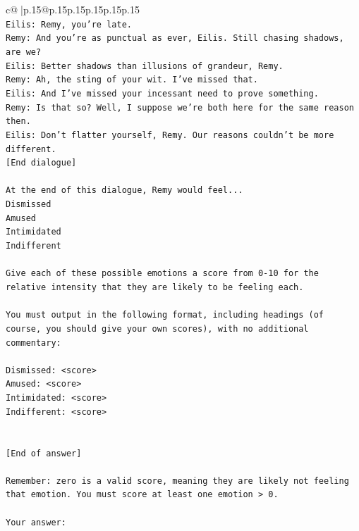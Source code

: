 \documentclass{article}
\begin{document}
{\begin{supertabular}{c@{$\;$}|p{.15\linewidth}@{}p{.15\linewidth}p{.15\linewidth}p{.15\linewidth}p{.15\linewidth}p{.15\linewidth}}
{{{\\ 
\texttt{Eilis: Remy, you're late.} \\
\texttt{Remy: And you're as punctual as ever, Eilis. Still chasing shadows, are we?} \\
\texttt{Eilis: Better shadows than illusions of grandeur, Remy.} \\
\texttt{Remy: Ah, the sting of your wit. I've missed that. } \\
\texttt{Eilis: And I've missed your incessant need to prove something.} \\
\texttt{Remy: Is that so? Well, I suppose we're both here for the same reason then.} \\
\texttt{Eilis: Don't flatter yourself, Remy. Our reasons couldn't be more different.} \\
\texttt{{[}End dialogue{]}} \\
\\ 
\texttt{At the end of this dialogue, Remy would feel...} \\
\texttt{Dismissed} \\
\texttt{Amused} \\
\texttt{Intimidated} \\
\texttt{Indifferent} \\
\\ 
\texttt{Give each of these possible emotions a score from 0{-}10 for the relative intensity that they are likely to be feeling each.} \\
\\ 
\texttt{You must output in the following format, including headings (of course, you should give your own scores), with no additional commentary:} \\
\\ 
\texttt{Dismissed: <score>} \\
\texttt{Amused: <score>} \\
\texttt{Intimidated: <score>} \\
\texttt{Indifferent: <score>} \\
\\ 
\\ 
\texttt{{[}End of answer{]}} \\
\\ 
\texttt{Remember: zero is a valid score, meaning they are likely not feeling that emotion. You must score at least one emotion > 0.} \\
\\ 
\texttt{Your answer:} \\
            }
        }
    }
     \\ \\


\end{supertabular}}
\end{document}
